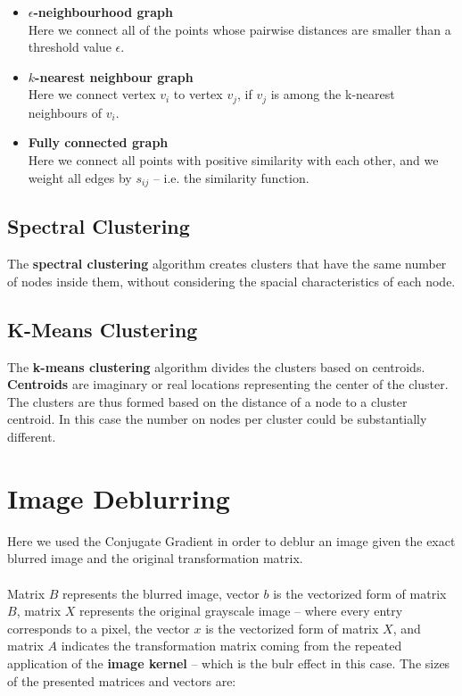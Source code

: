 \documentclass{article}
\begin{document}
\begin{itemize}
	\item \textbf{$\epsilon$-neighbourhood graph}
	\vspace{.2cm} \\
	Here we connect all of the points whose pairwise distances are smaller than a threshold value $\epsilon$.
	
	\item \textbf{$k$-nearest neighbour graph}
	\vspace{.2cm} \\
	Here we connect vertex $v_i$ to vertex $v_j$, if $v_j$ is among the k-nearest neighbours of $v_i$.
	
	\item \textbf{Fully connected graph}
	\vspace{.2cm} \\
	Here we connect all points with positive similarity with each other, and we weight all edges by $s_{ij}$ -- i.e. the similarity function.
\end{itemize}

\subsection{Spectral Clustering}
The \textbf{spectral clustering} algorithm creates clusters that have the same number of nodes inside them, without considering the spacial characteristics of each node.

\subsection{K-Means Clustering}
The \textbf{k-means clustering} algorithm divides the clusters based on centroids. \textbf{Centroids} are imaginary or real locations representing the center of the cluster. The clusters are thus formed based on the distance of a node to a cluster centroid. In this case the number on nodes per cluster could be substantially different.

\section{Image Deblurring}
Here we used the Conjugate Gradient in order to deblur an image given the exact blurred image and the original transformation matrix. \\ \\
Matrix $B$ represents the blurred image, vector $b$ is the vectorized form of matrix $B$, matrix $X$ represents the original grayscale image -- where every entry corresponds to a pixel, the vector $x$ is the vectorized form of matrix $X$, and matrix $A$ indicates the transformation matrix coming from the repeated application of the \textbf{image kernel} -- which is the bulr effect in this case. The sizes of the presented matrices and vectors are:
\end{document}
